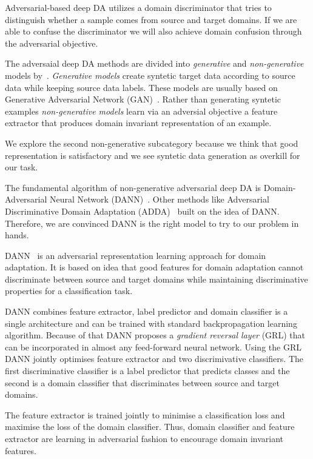 Adversarial-based deep DA utilizes a domain discriminator
that tries to distinguish whether a sample comes from source and target domains.
If we are able to confuse the discriminator
we will also achieve domain confusion through the adversarial objective.

The adversaial deep DA methods are divided into \textit{generative} and \textit{non-generative} models by~\cite{wang2018}.
\textit{Generative models} create syntetic target data according to source data
while keeping source data labels.
These models are usually based on Generative Adversarial Network (GAN)~\cite{goodfellow2014}.
Rather than generating syntetic examples \textit{non-generative models}
learn via an adversial objective a feature extractor
that produces domain invariant representation of an example.

We explore the second non-generative subcategory
because we think that good representation is satisfactory
and we see syntetic data generation as overkill for our task.

The fundamental algorithm of non-generative adversarial deep DA is
Domain-Adversarial Neural Network (DANN)~\cite{ganin2016}.
Other methods like Adversarial Discriminative Domain Adaptation (ADDA)~\cite{tzeng2017} built on the idea of DANN.
Therefore, we are convinced DANN is the right model to try to our problem in hands.

DANN~\cite{ganin2016} is an adversarial representation learning approach for domain adaptation.
It is based on idea that good features for domain adaptation
cannot discriminate between source and target domains
while maintaining discriminative properties for a classification task.

DANN combines feature extractor, label predictor and domain classifier is a single architecture
and can be trained with standard backpropagation learning algorithm.
Because of that DANN proposes a \textit{gradient reversal layer} (GRL)
that can be incorporated in almost any feed-forward neural network.
Using the GRL DANN jointly optimises feature extractor
and two discrimivative classifiers.
The first discriminative classifier is a label predictor that predicts classes
and the second is a domain classifier
that discriminates between source and target domains.

The feature extractor is trained jointly to minimise a classification loss
and maximise the loss of the domain classifier.
Thus, domain classifier and feature extractor are learning in adversarial fashion to encourage domain invariant features.

